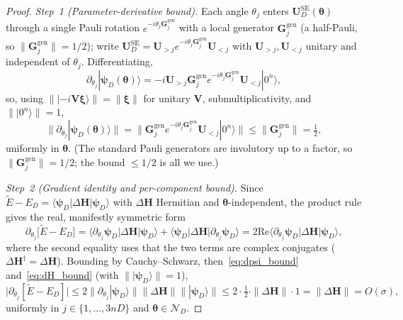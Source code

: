 \documentclass[11pt]{article}
\newcommand{\cN}{\mathcal{N}}
\theoremstyle{plain}
\theoremstyle{plain}
\begin{document}
\begin{proof}
\emph{Step~1 (Parameter-derivative bound).}
Each angle $\theta_j$ enters $\mathbf{U}_D^{\mathrm{SE}}(\bm\theta)$ through a
single Pauli rotation $e^{-i\theta_j\mathbf{G}_j^{\mathrm{gen}}}$ with a
local generator $\mathbf{G}_j^{\mathrm{gen}}$ (a half-Pauli, so
$\|\mathbf{G}_j^{\mathrm{gen}}\|=1/2$); write
$\mathbf{U}_D^{\mathrm{SE}}=\mathbf{U}_{>j} e^{-i\theta_j\mathbf{G}_j^{\mathrm{gen}}} \mathbf{U}_{<j}$
with $\mathbf{U}_{>j},\mathbf{U}_{<j}$ unitary and independent of $\theta_j$.
Differentiating,
\begin{equation}\label{eq:dpsi}
  \partial_{\theta_j}|\boldsymbol{\psi}_D(\bm\theta)\rangle
  =-i \mathbf{U}_{>j} \mathbf{G}_j^{\mathrm{gen}} 
    e^{-i\theta_j\mathbf{G}_j^{\mathrm{gen}}} \mathbf{U}_{<j}|0^n\rangle ,
\end{equation}
so, using $\||{-i}\mathbf{V}\boldsymbol{\xi}\rangle\|=\|\boldsymbol{\xi}\|$ for unitary
$\mathbf{V}$, submultiplicativity, and $\||0^n\rangle\|=1$,
\begin{equation}\label{eq:dpsi_bound}
  \bigl\|\partial_{\theta_j}|\boldsymbol{\psi}_D(\bm\theta)\rangle\bigr\|
  =\bigl\|\mathbf{G}_j^{\mathrm{gen}} 
     e^{-i\theta_j\mathbf{G}_j^{\mathrm{gen}}} \mathbf{U}_{<j}|0^n\rangle\bigr\|
  \le\|\mathbf{G}_j^{\mathrm{gen}}\|
  =\tfrac12 ,
\end{equation}
uniformly in $\bm\theta$.  (The standard Pauli generators are
involutory up to a factor, so $\|\mathbf{G}_j^{\mathrm{gen}}\|=1/2$; the
bound $\le 1/2$ is all we use.)

\emph{Step~2 (Gradient identity and per-component bound).}
Since $\widetilde{E}-E_D=\langle\boldsymbol{\psi}_D|\Delta\mathbf{H}|\boldsymbol{\psi}_D\rangle$
with $\Delta\mathbf{H}$ Hermitian and $\bm\theta$-independent, the product
rule gives the real, manifestly symmetric form
\begin{equation}\label{eq:grad_identity}
  \partial_{\theta_j}\bigl[\widetilde{E}-E_D\bigr]
  =\langle\partial_{\theta_j}\boldsymbol{\psi}_D|\Delta\mathbf{H}|\boldsymbol{\psi}_D\rangle
   +\langle\boldsymbol{\psi}_D|\Delta\mathbf{H}|\partial_{\theta_j}\boldsymbol{\psi}_D\rangle
  =2 \mathrm{Re} 
    \langle\partial_{\theta_j}\boldsymbol{\psi}_D| \Delta\mathbf{H} |\boldsymbol{\psi}_D\rangle ,
\end{equation}
where the second equality uses that the two terms are complex
conjugates ($\Delta\mathbf{H}^\dagger=\Delta\mathbf{H}$).  Bounding by
Cauchy--Schwarz, then~\eqref{eq:dpsi_bound} and~\eqref{eq:dH_bound}
(with $\||\boldsymbol{\psi}_D\rangle\|=1$),
\begin{equation}\label{eq:grad_comp_bound}
  \bigl|\partial_{\theta_j}[\widetilde{E}-E_D]\bigr|
  \le 2 \bigl\|\partial_{\theta_j}|\boldsymbol{\psi}_D\rangle\bigr\| 
        \|\Delta\mathbf{H}\| \||\boldsymbol{\psi}_D\rangle\|
  \le 2\cdot\tfrac12\cdot\|\Delta\mathbf{H}\|\cdot 1
  =\|\Delta\mathbf{H}\|=O(\sigma),
\end{equation}
uniformly in $j\in\{1,\dots,3nD\}$ and $\bm\theta\in\cN_D$.


\end{proof}
\end{document}
